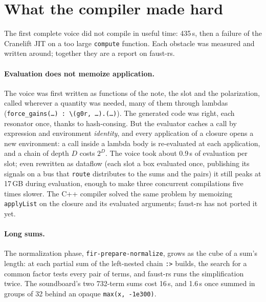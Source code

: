 \documentclass[10pt,a4paper,twocolumn]{article}
\newcommand{\faustrs}{faust-rs}
\newcommand{\code}[1]{\texttt{#1}}
\begin{document}
\section{What the compiler made hard}
\label{sec:compiler}

The first complete voice did not compile in useful time: 435\,s, then a failure of the Cranelift JIT on a too large \code{compute} function. Each obstacle was measured and written around; together they are a report on \faustrs{}.

\paragraph{Evaluation does not memoize application.} The voice was first written as functions of the note, the slot and the polarization, called wherever a quantity was needed, many of them through lambdas (\code{force\_gains(\dots) : \textbackslash(g0r, \dots).(\dots)}). The generated code was right, each resonator once, thanks to hash-consing. But the evaluator caches a call by expression and environment \emph{identity}, and every application of a closure opens a new environment: a call inside a lambda body is re-evaluated at each application, and a chain of depth $D$ costs $2^D$. The voice took about 0.9\,s of evaluation per slot; even rewritten as dataflow (each slot a box evaluated once, publishing its signals on a bus that \code{route} distributes to the sums and the pairs) it still peaks at 17\,GB during evaluation, enough to make three concurrent compilations five times slower. The C++ compiler solved the same problem by memoizing \code{applyList} on the closure and its evaluated arguments; \faustrs{} has not ported it yet.

\paragraph{Long sums.} The normalization phase, \code{fir-prepare-normalize}, grows as the cube of a sum's length: at each partial sum of the left-nested chain \code{:>} builds, the search for a common factor tests every pair of terms, and \faustrs{} runs the simplification twice. The soundboard's two 732-term sums cost 16\,s, and 1.6\,s once summed in groups of 32 behind an opaque \code{max(x, -1e300)}.
\end{document}

